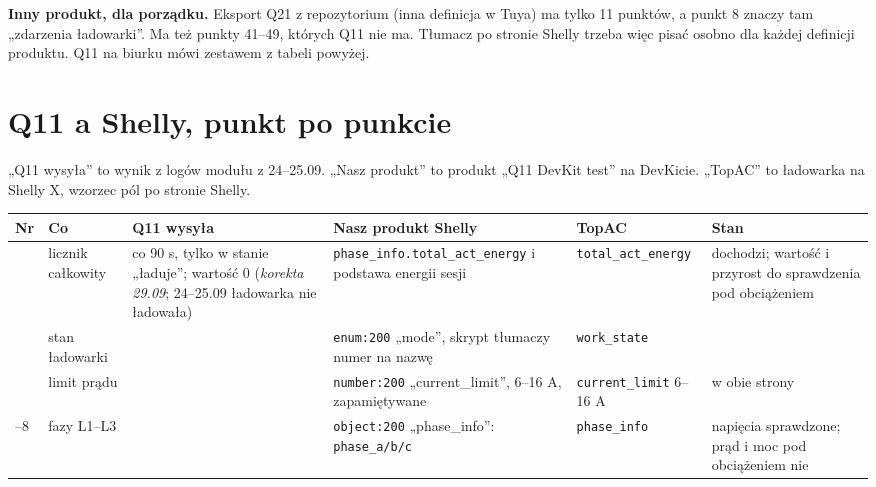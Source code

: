 \documentclass[11pt,a4paper]{article}
\begin{document}
\textbf{Inny produkt, dla porządku.} Eksport Q21 z repozytorium (inna definicja w Tuya) ma tylko 11 punktów, a punkt 8 znaczy tam „zdarzenia ładowarki”. Ma też punkty 41–49, których Q11 nie ma. Tłumacz po stronie Shelly trzeba więc pisać osobno dla każdej definicji produktu. Q11 na biurku mówi zestawem z tabeli powyżej.


\section{Q11 a Shelly, punkt po punkcie}

„Q11 wysyła” to wynik z logów modułu z 24–25.09. „Nasz produkt” to produkt „Q11 DevKit test” na DevKicie. „TopAC” to ładowarka na Shelly X, wzorzec pól po stronie Shelly.


\begin{longtable}{>{\raggedright\arraybackslash}p{3.00cm}>{\raggedright\arraybackslash}p{1.81cm}>{\raggedright\arraybackslash}p{2.10cm}>{\raggedright\arraybackslash}p{2.59cm}>{\raggedright\arraybackslash}p{1.95cm}>{\raggedright\arraybackslash}p{2.51cm}}
\toprule
\rowcolor{apteallight}\textbf{Nr} & \textbf{Co} & \textbf{Q11 wysyła} & \textbf{Nasz produkt Shelly} & \textbf{TopAC} & \textbf{Stan} \\
\midrule\endhead
\bottomrule\endfoot
1 & licznik całkowity & \leavevmode{\symbolfont\color{apgreen}\textbf{✔}} co 90 s, tylko w stanie „ładuje”; wartość 0 (\emph{korekta 29.09}; 24–25.09 ładowarka nie ładowała) & \texttt{phase\_\allowbreak{}info.\allowbreak{}total\_\allowbreak{}act\_\allowbreak{}energy} i podstawa energii sesji & \texttt{total\_\allowbreak{}act\_\allowbreak{}energy} & \leavevmode{\symbolfont\color{apamber}\textbf{◐}} dochodzi; wartość i przyrost do sprawdzenia pod obciążeniem \\
3 & stan ładowarki & \leavevmode{\symbolfont\color{apgreen}\textbf{✔}} & \texttt{enum:200} „mode”, skrypt tłumaczy numer na nazwę & \texttt{work\_state} & \leavevmode{\symbolfont\color{apgreen}\textbf{✔}} \\
4 & limit prądu & \leavevmode{\symbolfont\color{apgreen}\textbf{✔}} & \texttt{number:200} „current\_limit”, 6–16 A, zapamiętywane & \texttt{current\_\allowbreak{}limit} 6–16 A & \leavevmode{\symbolfont\color{apgreen}\textbf{✔}} w obie strony \\
6–8 & fazy L1–L3 & \leavevmode{\symbolfont\color{apgreen}\textbf{✔}} & \texttt{object:200} „phase\_info”: \texttt{phase\_a/b/c} & \texttt{phase\_info} & \leavevmode{\symbolfont\color{apamber}\textbf{◐}} napięcia sprawdzone; prąd i moc pod obciążeniem nie \\

\end{longtable}
\end{document}
